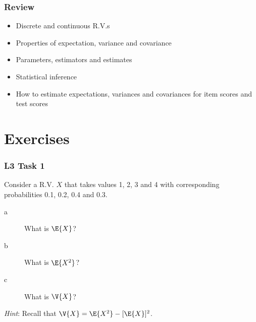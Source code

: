 \documentclass[compress]{beamer}\usepackage[]{graphicx}\usepackage[]{xcolor}
\begin{document}
%
%


\begin{frame}[fragile]
  \frametitle{Review}
    \begin{itemize}
      \item Discrete and continuous R.V.s
      \item Properties of expectation, variance and covariance
      \item Parameters, estimators and estimates
      \item Statistical inference
      \item How to estimate expectations, variances and covariances for item scores and test scores
    \end{itemize}
\end{frame}


\section{Exercises}

\begin{frame}[fragile]
  \frametitle{L3 Task 1}
    Consider a R.V. $X$ that takes values 1, 2, 3 and 4 with corresponding probabilities 0.1, 0.2, 0.4 and 0.3.
      \begin{description}
        \item[a] What is $\E{X}$?
        \item[b] What is $\E{X^2}$?
        \item[c] What is $\V{X}$?
      \end{description}

    \textit{Hint}: Recall that $\V{X}= \E{X^2} - [\E{X}]^2$.
\end{frame}
\end{document}
